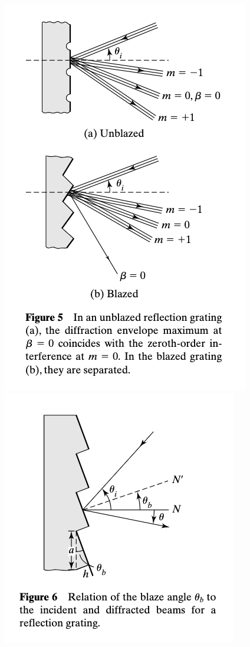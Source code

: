 \documentclass[10pt]{article}
\begin{document}
\begin{center}
\includegraphics*[scale = .8]{imgs/fig-5.png}
\includegraphics[scale = .8]{imgs/fig-6.png}
\end{center}
\end{document}

